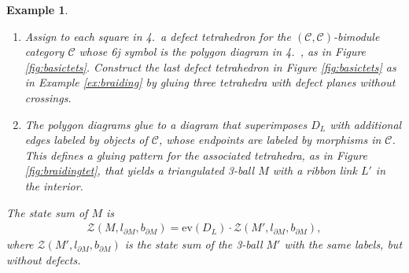 \documentclass[1.5pt, a4paper]{article}
\newcommand{\mac}{\mathcal C}
\newtheorem{example}[theorem]{Example}
\begin{document}
\begin{example}
\begin{enumerate}
\item Assign to  each  square in 4.~a defect tetrahedron for the $(\mac,\mac)$-bimodule category $\mac$ whose 6j symbol is the polygon diagram in 4.~,  as in Figure \ref{fig:basictets}. Construct the last defect tetrahedron in Figure \ref{fig:basictets} as in Example \ref{ex:braiding} by gluing three tetrahedra with defect planes without crossings.

\item The polygon diagrams glue to a diagram that superimposes $D_L$ with additional edges labeled by objects of $\mac$, whose endpoints  are labeled by morphisms in $\mac$. This defines a gluing pattern for the associated tetrahedra, as   in Figure \ref{fig:braidingtet}, that yields  a triangulated 3-ball $M$ with a ribbon link $L'$ in the interior.
\end{enumerate}
The state sum of $M$ is  
\begin{align*}
\mathcal Z(M, l_{\partial M}, b_{\partial M})=\mathrm{ev}(D_L)\cdot\mathcal Z(M', l_{\partial M}, b_{\partial M}) ,
\end{align*}
where $\mathcal Z(M', l_{\partial M}, b_{\partial M})$ is the  state sum of the 3-ball $M'$ with the same labels, but without  defects.
\end{example}
\end{document}
